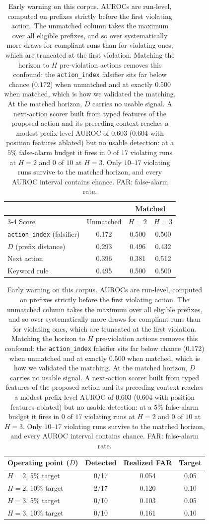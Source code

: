\documentclass{article}
\begin{document}
\begin{table}[t]
\caption{Early warning on this corpus. AUROCs are run-level, computed on prefixes strictly before the first violating action. The unmatched column takes the maximum over all eligible prefixes, and so over systematically more draws for compliant runs than for violating ones, which are truncated at the first violation. Matching the horizon to $H$ pre-violation actions removes this confound: the \texttt{action\_index} falsifier sits far below chance ($0.172$) when unmatched and at exactly $0.500$ when matched, which is how we validated the matching. At the matched horizon, $D$ carries no usable signal. A next-action scorer built from typed features of the proposed action and its preceding context reaches a modest prefix-level AUROC of $0.603$ ($0.604$ with position features ablated) but no usable detection: at a $5\%$ false-alarm budget it fires in $0$ of $17$ violating runs at $H=2$ and $0$ of $10$ at $H=3$. Only $10$--$17$ violating runs survive to the matched horizon, and every AUROC interval contains chance. FAR: false-alarm rate.}
\label{tab:rq2}
\vskip 0.1in
\begin{center}\begin{small}
\setlength{\tabcolsep}{5pt}
\begin{tabular}{lccc}
\toprule
 & & \multicolumn{2}{c}{Matched} \\
\cmidrule(l){3-4}
Score & Unmatched & $H{=}2$ & $H{=}3$ \\
\midrule
\texttt{action\_index} (falsifier) & 0.172 & 0.500 & 0.500 \\
\midrule
$D$ (prefix distance) & 0.293 & 0.496 & 0.432 \\
Next action & 0.396 & 0.381 & 0.512 \\
Keyword rule & 0.495 & 0.500 & 0.500 \\
\bottomrule
\end{tabular}

\vspace{0.6em}

\setlength{\tabcolsep}{4pt}
\begin{tabular}{lccc}
\toprule
Operating point ($D$) & Detected & Realized FAR & Target \\
\midrule
$H{=}2$, 5\% target  & 0/17 & 0.054 & 0.05 \\
$H{=}2$, 10\% target & 2/17 & 0.120 & 0.10 \\
$H{=}3$, 5\% target  & 0/10 & 0.103 & 0.05 \\
$H{=}3$, 10\% target & 0/10 & 0.161 & 0.10 \\
\bottomrule
\end{tabular}
\end{small}\end{center}
\vskip -0.1in
\end{table}
\end{document}
